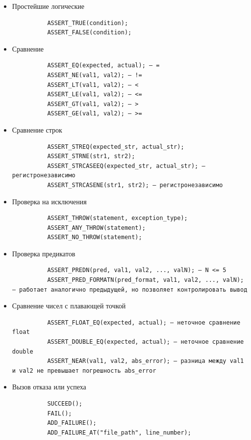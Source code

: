 \documentclass[12pt, twoside]{report}
\begin{document}
\begin{itemize}
  \item Простейшие логические
        \begin{verbatim}
          ASSERT_TRUE(condition);
          ASSERT_FALSE(condition);
        \end{verbatim}

  \item Сравнение
        \begin{verbatim}
          ASSERT_EQ(expected, actual); — =
          ASSERT_NE(val1, val2); — !=
          ASSERT_LT(val1, val2); — <
          ASSERT_LE(val1, val2); — <=
          ASSERT_GT(val1, val2); — >
          ASSERT_GE(val1, val2); — >=
        \end{verbatim}

  \item Сравнение строк
        \begin{verbatim}
          ASSERT_STREQ(expected_str, actual_str);
          ASSERT_STRNE(str1, str2);
          ASSERT_STRCASEEQ(expected_str, actual_str); — регистронезависимо
          ASSERT_STRCASENE(str1, str2); — регистронезависимо
        \end{verbatim}

  \item Проверка на исключения
        \begin{verbatim}
          ASSERT_THROW(statement, exception_type);
          ASSERT_ANY_THROW(statement);
          ASSERT_NO_THROW(statement);
        \end{verbatim}

  \item Проверка предикатов
        \begin{verbatim}
          ASSERT_PREDN(pred, val1, val2, ..., valN); — N <= 5
          ASSERT_PRED_FORMATN(pred_format, val1, val2, ..., valN); — работает аналогично предыдущей, но позволяет контролировать вывод
        \end{verbatim}

  \item Сравнение чисел с плавающей точкой
        \begin{verbatim}
          ASSERT_FLOAT_EQ(expected, actual); — неточное сравнение float
          ASSERT_DOUBLE_EQ(expected, actual); — неточное сравнение double
          ASSERT_NEAR(val1, val2, abs_error); — разница между val1 и val2 не превышает погрешность abs_error
        \end{verbatim}

  \item Вызов отказа или успеха
        \begin{verbatim}
          SUCCEED();
          FAIL();
          ADD_FAILURE();
          ADD_FAILURE_AT("file_path", line_number);
        \end{verbatim}
\end{itemize}
\end{document}

